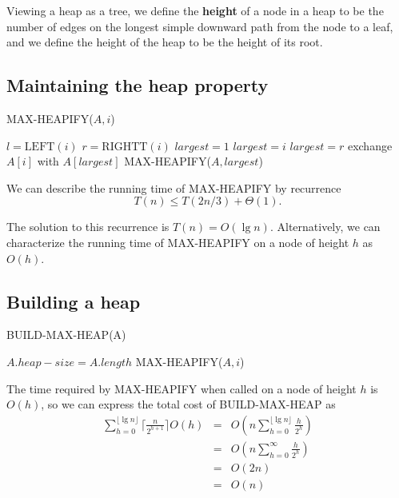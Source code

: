 \documentclass[12pt]{article}
\begin{document}
Viewing a heap as a tree, we define the {\bf height} of a node in a heap to be the number of edges on the longest simple downward path from the node to a leaf, and we define the height of the heap to be the height of its root.

\subsection{Maintaining the heap property}

 MAX-HEAPIFY($A,i$)
\begin{algorithmic}[1]
\State $l = \text {LEFT}(i)$
\State $r = \text {RIGHTT}(i)$
	\State $largest = 1$
\Else
	\State $largest = i$
\EndIf
{}
	\State $largest = r$
\EndIf
{}
	\State exchange $A[i]$ with $A[largest]$
        \State MAX-HEAPIFY($A, largest$)
\EndIf
\end{algorithmic}

We can describe the running time of MAX-HEAPIFY by recurrence
\begin{equation*}
  T(n) \le T(2n/3) + \Theta(1).
\end{equation*}

The solution to this recurrence is $T(n) = O(\lg n)$. Alternatively, we can characterize the running time of MAX-HEAPIFY on a node of height $h$ as $O(h)$.

\subsection{Building a heap}

BUILD-MAX-HEAP(A)
\begin{algorithmic}[1]
\State $A.heap-size = A.length$
	\State MAX-HEAPIFY($A, i$)
\EndFor
\end{algorithmic}

The time required by MAX-HEAPIFY when called on a node of height $h$ is $O(h)$, so we can express the total cost of BUILD-MAX-HEAP as
\begin{eqnarray*}
  \sum_{h=0}^{\lfloor \lg n \rfloor} \lceil \frac {n}{2^{h+1}} \rceil O(h)
  &=& O(n \sum_{h=0}^{\lfloor \lg n \rfloor} \frac {h}{2^h}) \\
  &=& O(n \sum_{h=0}^{\infty} \frac {h}{2^h}) \\
  &=& O(2n) \\
  &=& O(n)
\end{eqnarray*}
\end{document}
